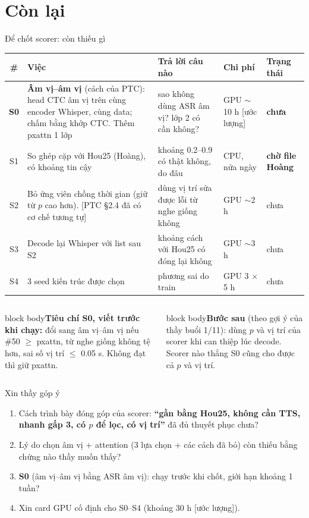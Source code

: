 \documentclass[aspectratio=169,xcolor=table]{beamer}
\newcommand{\bad}[1]{\textcolor{RiskRed}{\textbf{#1}}}
\newcommand{\src}[1]{{\tiny\color{TextGray}[#1]}}
\newcommand{\nbox}[2][block body]{\begin{beamercolorbox}[sep=0.45em,rounded=true]{#1}\footnotesize #2\end{beamercolorbox}}
\begin{document}
\section{Còn lại}
\begin{frame}{Để chốt scorer: còn thiếu gì}
\centering\scriptsize\setlength{\tabcolsep}{4pt}
\begin{tabular}{cL{5.0cm}L{4.0cm}L{2.0cm}L{1.6cm}}
\toprule
\# & Việc & Trả lời câu nào & Chi phí & Trạng thái\\
\midrule
\textbf{S0} & \textbf{Âm vị--âm vị} (cách của PTC): head CTC âm vị trên cùng encoder Whisper, cùng data; chấm bằng khớp CTC. Thêm pxattn 1 lớp & sao không dùng ASR âm vị? lớp 2 có cần không? & GPU $\sim$10 h \src{ước lượng} & \bad{chưa}\\
S1 & So ghép cặp với Hou25 (Hoàng), có khoảng tin cậy & khoảng 0.2--0.9 có thật không, do đâu & CPU, nửa ngày & \bad{chờ file Hoàng}\\
S2 & Bỏ ứng viên chồng thời gian (giữ từ $p$ cao hơn). \src{PTC §2.4 đã có cơ chế tương tự} & dùng vị trí sửa được lỗi từ nghe giống không & GPU $\sim$2 h & chưa\\
S3 & Decode lại Whisper với list sau S2 & khoảng cách với Hou25 có đóng lại không & GPU $\sim$3 h & chưa\\
S4 & 3 seed kiến trúc được chọn & phương sai do train & GPU 3 $\times$ 5 h & chưa\\
\bottomrule
\end{tabular}\par
\vspace{0.25cm}\raggedright
\begin{columns}[T]
\begin{column}{0.48\textwidth}
\nbox{\textbf{Tiêu chí S0, viết trước khi chạy:} đổi sang âm vị--âm vị nếu \#50 $\geq$ pxattn, từ nghe giống không tệ hơn, sai số vị trí $\leq$ 0.05 s. Không đạt thì giữ pxattn.}
\end{column}
\begin{column}{0.48\textwidth}
\nbox{\textbf{Bước sau} (theo gợi ý của thầy buổi 1/11): dùng $p$ và vị trí của scorer khi can thiệp lúc decode. Scorer nào thắng S0 cũng cho được cả $p$ và vị trí.}
\end{column}
\end{columns}
\end{frame}

\begin{frame}{Xin thầy góp ý}
\begin{enumerate}\setlength{\itemsep}{8pt}
\item Cách trình bày đóng góp của scorer: \textbf{``gần bằng Hou25, không cần TTS, nhanh gấp 3, có $p$ để lọc, có vị trí''} đã đủ thuyết phục chưa?
\item Lý do chọn âm vị + attention (3 lựa chọn + các cách đã bỏ) còn thiếu bằng chứng nào thầy muốn thấy?
\item \textbf{S0} (âm vị--âm vị bằng ASR âm vị): chạy trước khi chốt, giới hạn khoảng 1 tuần?
\item Xin card GPU cố định cho S0--S4 (khoảng 30 h \src{ước lượng}).
\end{enumerate}
\end{frame}
\end{document}
